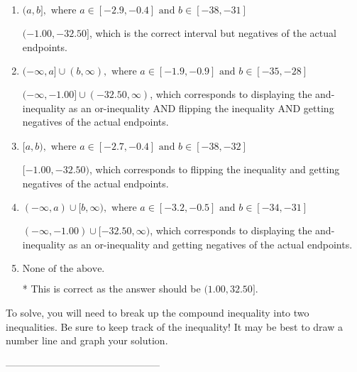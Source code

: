 \documentclass{extbook}[14pt]
\begin{document}
\begin{enumerate}[label=\Alph*.] 
\item $ (a, b], \text{ where } a \in [-2.9, -0.4] \text{ and } b \in [-38, -31] $ 

 $(-1.00, -32.50]$, which is the correct interval but negatives of the actual endpoints. 
\item $ (-\infty, a] \cup (b, \infty), \text{ where } a \in [-1.9, -0.9] \text{ and } b \in [-35, -28] $ 

 $(-\infty, -1.00] \cup (-32.50, \infty)$, which corresponds to displaying the and-inequality as an or-inequality AND flipping the inequality AND getting negatives of the actual endpoints. 
\item $ [a, b), \text{ where } a \in [-2.7, -0.4] \text{ and } b \in [-38, -32] $ 

 $[-1.00, -32.50)$, which corresponds to flipping the inequality and getting negatives of the actual endpoints. 
\item $ (-\infty, a) \cup [b, \infty), \text{ where } a \in [-3.2, -0.5] \text{ and } b \in [-34, -31] $ 

 $(-\infty, -1.00) \cup [-32.50, \infty)$, which corresponds to displaying the and-inequality as an or-inequality and getting negatives of the actual endpoints. 
\item $ \text{None of the above.} $ 

 * This is correct as the answer should be $(1.00, 32.50]$. 
\end{enumerate} 
 
To solve, you will need to break up the compound inequality into two inequalities. Be sure to keep track of the inequality! It may be best to draw a number line and graph your solution.

-----------------------------------------------
\end{document}
